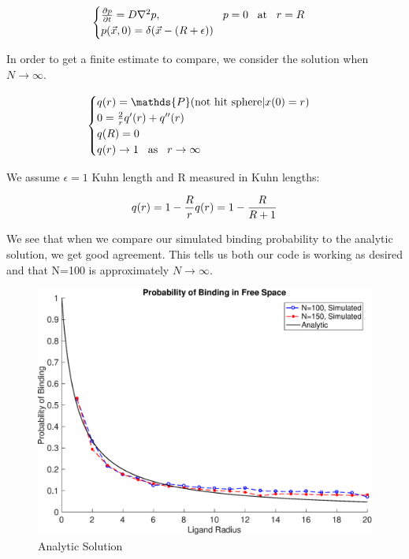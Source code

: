 \documentclass[../AdvancementSummary.tex]{subfiles}
\begin{document}
\begin{equation}\label{eq: diffusion}
	\begin{cases}
		\frac{\partial p}{\partial t} = D \nabla^2 p, \hspace{2cm} p=0 \hspace{3mm}\text{at}\hspace{3mm} r=R\\
		p(\vec{x},0) = \delta(\vec{x}-(R+\epsilon))\\
	\end{cases}
\end{equation}

In order to get a finite estimate to compare, we consider the solution when $N\rightarrow \infty$.

 \begin{equation}\label{eq: analytic}
  	\begin{cases}
 	q(r)=\mathds{P}(\text{not hit sphere}|x(0)=r) \\
 	0=\frac{2}{r}q'(r)+q''(r) \\
 	q(R) = 0 \\
 	q(r) \rightarrow 1 \hspace{3mm}\text{as}\hspace{3mm} r \rightarrow \infty \\
 	\end{cases}
 \end{equation}

 We assume $\epsilon = 1$ Kuhn length and R measured in Kuhn lengths:

 \begin{equation}\label{eq: analyticSolution}
q(r) = 1-\frac{R}{r}\\
q(r) = 1-\frac{R}{R+1} \\
 \end{equation}
 
 We see that when we compare our simulated binding probability to the analytic solution, we get good agreement. This tells us both our code is working as desired and that N=100 is approximately $N \rightarrow \infty$.

 \begin{figure}[H]
 \begin{center}
 \includegraphics[width=0.7\linewidth]{ModelConfirmationFigures/BindingVSAnalyticN100N150.eps}
 \end{center}
  \caption{Analytic Solution \label{fig: AnalyticBinding}}
 \end{figure}
\end{document}
